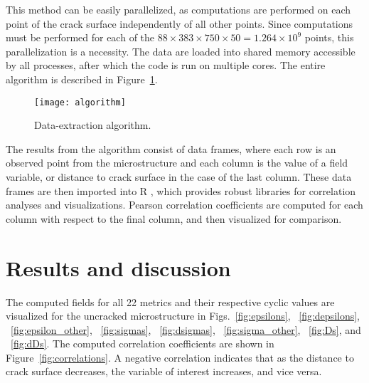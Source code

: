 This method can be easily parallelized, as computations are performed on each point of the crack surface independently of all other points. Since computations must be performed for each of the $88 \times 383 \times 750 \times 50 = 1.264\times 10^{9}$ points, this parallelization is a necessity.  The data are loaded into shared memory accessible by all processes, after which the code is run on multiple cores. The entire algorithm is described in Figure~\ref{fig:algorithm}.
\begin{figure}[b]
  \centering
    \texttt{[image: algorithm]}
    \caption{Data-extraction algorithm.}
    \label{fig:algorithm}
\end{figure}

The results from the algorithm consist of data frames, where each row is an observed point from the microstructure and each column is the value of a field variable, or distance to crack surface in the case of the last column. These data frames are then imported into R \cite{statistical2009r}, which provides robust libraries for correlation analyses and visualizations. Pearson correlation coefficients are computed for each column with respect to the final column, and then visualized for comparison.

\section{Results and discussion}\label{results}
The computed fields for all 22 metrics and their respective cyclic values are visualized for the uncracked microstructure in Figs.~\ref{fig:epsilons}, ~\ref{fig:depsilons}, ~\ref{fig:epsilon_other}, ~\ref{fig:sigmas}, ~\ref{fig:dsigmas}, ~\ref{fig:sigma_other}, ~\ref{fig:Ds}, and ~\ref{fig:dDs}. The computed correlation coefficients are shown in Figure~\ref{fig:correlations}. A negative correlation indicates that as the distance to crack surface decreases, the variable of interest increases, and vice versa.

